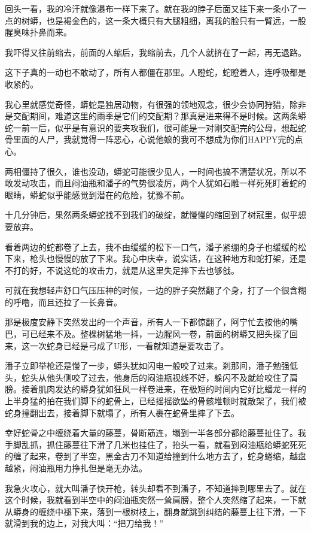 回头一看，我的冷汗就像瀑布一样下来了。就在我的脖子后面又挂下来一条小了一点的树蟒，也是褐金色的，这一条大概只有大腿粗细，离我的脸只有一臂远，一股腥臭味扑鼻而来。

我吓得又往前缩去，前面的人缩后，我缩前去，几个人就挤在了一起，再无退路。

这下子真的一动也不敢动了，所有人都僵在那里。人瞪蛇，蛇瞪着人，连呼吸都是收紧的。

我心里就感觉奇怪，蟒蛇是独居动物，有很强的领地观念，很少会协同狩猎，除非是交配期间，难道这里的雨季是它们的交配期？那真是进来得不是时候。这两条蟒蛇一前一后，似乎是有意识的要夹攻我们，很可能是一对刚交配完的公母，想起蛇骨里面的人尸，我就觉得一阵恶心，心说他娘的我可不想成为你们HAPPY完的点心。

两相僵持了很久，谁也没动，蟒蛇可能很少见人，一时间也搞不清楚状况，所以不敢发动攻击，而且闷油瓶和潘子的气势很凌厉，两个人犹如石雕一样死死盯着蛇的眼睛，蟒蛇似乎能感觉到潜在的危险，犹豫不前。

十几分钟后，果然两条蟒蛇找不到我们的破绽，就慢慢的缩回到了树冠里，似乎想要放弃。

看着两边的蛇都卷了上去，我不由缓缓的松下一口气，潘子紧绷的身子也缓缓的松下来，枪头也慢慢的放了下来。我心中庆幸，说实话，在这种地方和蛇打架，还是不打的好，不说这蛇的攻击力，就是从这里失足摔下去也够戗。

可就在我想轻声舒口气压压神的时候，一边的胖子突然翻了个身，打了一个很含糊的呼噜，而且还拉了一长鼻音。

那是极度安静下突然发出的一个声音，所有人一下都惊翻了，阿宁忙去按他的嘴巴，可已经来不及。整棵树猛地一抖，一边腥风一卷，前面的树蟒又把头探了回来，这一次蛇身已经是弓成了U形，一看就知道是要攻击了。

潘子立即举枪还是慢了一步，蟒头犹如闪电一般咬了过来。刹那间，潘子勉强低头，蛇头从他头侧咬了过去，他身后的闷油瓶视线不好，躲闪不及就给咬住了肩膀。接着肌肉发达的蟒身犹如狂风一样卷进来，在极短的时间内它好比蟠龙一样的上半身猛的拍在我们脚下的蛇骨上，已经摇摇欲坠的骨骸堆顿时就散架了，我们被蛇身撞翻出去，接着脚下就塌了，所有人裹在蛇骨里摔了下去。

幸好蛇骨之中缠绕着大量的藤蔓，骨断筋连，塌到一半各部分都给藤蔓扯住了。我手脚乱抓，抓住藤蔓往下滑了几米也挂住了，抬头一看，就看到闷油瓶给蟒蛇死死的缠了起来，卷到了半空，黑金古刀不知道给撞到什么地方去了，蛇身蜷缩，越盘越紧，闷油瓶用力挣扎但是毫无办法。

我急火攻心，就大叫潘子快开枪，转头却看不到潘子，不知道摔到哪里去了。就在这个时候，我就看到半空中的闷油瓶突然一耸肩膀，整个人突然缩了起来，一下就从蟒身的缠绕中褪下来，落到一根树枝上，翻身就跳到纠结的藤蔓上往下滑，一下就滑到我的边上，对我大叫：“把刀给我！”

